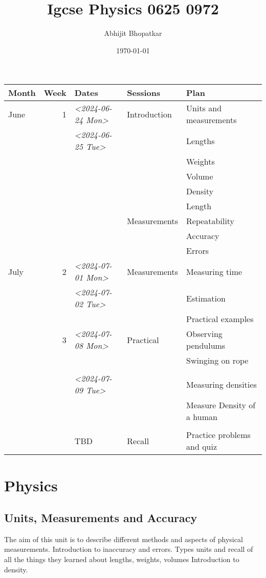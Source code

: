 \documentclass[11pt]{article}
\author{Abhijit Bhopatkar}
\date{\today}
\title{Igcse Physics 0625 0972}
\begin{document}
\maketitle
\tableofcontents

\begin{center}
\begin{tabular}{lrlll}
\hline
Month & Week & Dates & Sessions & Plan\\[0pt]
\hline
June & 1 & \textit{<2024-06-24 Mon>} & Introduction & Units and measurements\\[0pt]
 &  & \textit{<2024-06-25 Tue>} &  & Lengths\\[0pt]
 &  &  &  & Weights\\[0pt]
 &  &  &  & Volume\\[0pt]
 &  &  &  & Density\\[0pt]
 &  &  &  & Length\\[0pt]
 &  &  & Measurements & Repeatability\\[0pt]
 &  &  &  & Accuracy\\[0pt]
 &  &  &  & Errors\\[0pt]
\hline
July & 2 & \textit{<2024-07-01 Mon>} & Measurements & Measuring time\\[0pt]
 &  & \textit{<2024-07-02 Tue>} &  & Estimation\\[0pt]
 &  &  &  & Practical examples\\[0pt]
\hline
 & 3 & \textit{<2024-07-08 Mon>} & Practical & Observing pendulums\\[0pt]
 &  &  &  & Swinging on rope\\[0pt]
 &  &  &  & \\[0pt]
 &  & \textit{<2024-07-09 Tue>} &  & Measuring densities\\[0pt]
 &  &  &  & Measure Density of a human\\[0pt]
 &  &  &  & \\[0pt]
\hline
 &  & TBD & Recall & Practice problems and quiz\\[0pt]
\hline
\end{tabular}
\end{center}


\section{Physics}
\label{sec:orgb62e3d9}
\subsection{Units, Measurements and Accuracy}
\label{sec:orge27853c}
The aim of this unit is to describe different methods and aspects of physical measurements.
Introduction to inaccuracy and errors. Types units and recall of all the things they learned about lengths, weights, volumes
Introduction to density.
\end{document}
